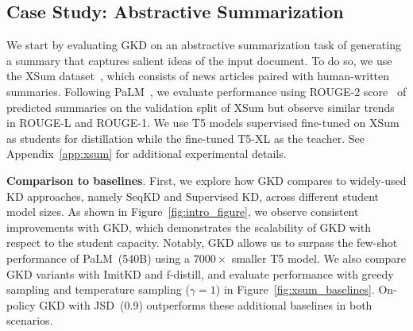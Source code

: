 \documentclass{article} %
\begin{document}
\subsection{Case Study: Abstractive Summarization}
We start by evaluating GKD on an abstractive summarization task of generating a summary that captures salient ideas of the input document. To do so, we use the XSum dataset~\citep{narayan2018don}, which consists of news articles paired with human-written summaries. Following PaLM~\citep{chowdhery2022palm}, we evaluate performance using ROUGE-2 score~\citep{lin2004rouge} of predicted summaries on the validation split of XSum but observe similar trends in ROUGE-L and ROUGE-1. We use T5 models supervised fine-tuned on XSum as students for distillation while the fine-tuned T5-XL as the teacher. 
 See Appendix~\ref{app:xsum} for additional experimental details. 



\textbf{Comparison to baselines}. First, we explore how GKD compares to widely-used KD approaches, namely SeqKD and Supervised KD, across different student model sizes. As shown in Figure~\ref{fig:intro_figure}, we observe consistent improvements with GKD, which demonstrates the scalability of GKD with respect to the student capacity. Notably, GKD allows us to surpass the few-shot performance of PaLM~(540B) using a $7000\times$ smaller T5 model. We also compare GKD variants with ImitKD and f-distill, and evaluate performance with greedy sampling and temperature sampling ($\gamma=1$) in Figure~\ref{fig:xsum_baselines}. On-policy GKD with JSD~(0.9) outperforms these additional baselines in both scenarios. 
\end{document}
